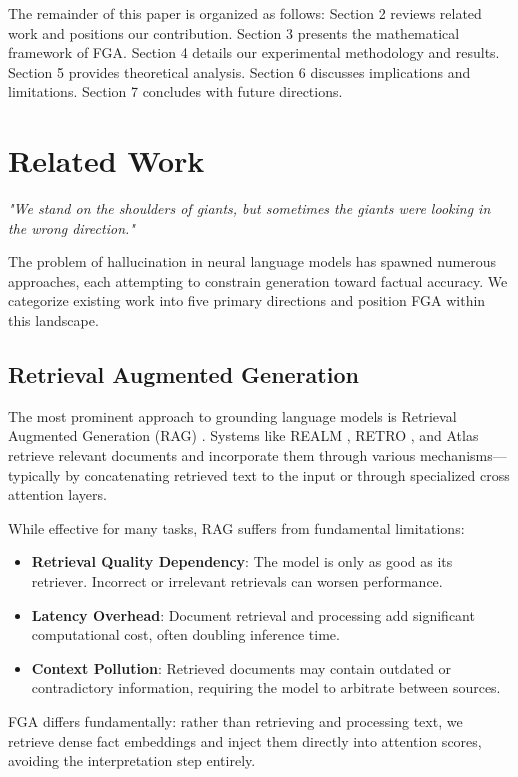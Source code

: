 \documentclass[11pt, a4paper]{article}
\theoremstyle{definition}
\begin{document}
The remainder of this paper is organized as follows: Section 2 reviews related work and positions our contribution. Section 3 presents the mathematical framework of FGA. Section 4 details our experimental methodology and results. Section 5 provides theoretical analysis. Section 6 discusses implications and limitations. Section 7 concludes with future directions.

\section{Related Work}

\textit{"We stand on the shoulders of giants, but sometimes the giants were looking in the wrong direction."}

The problem of hallucination in neural language models has spawned numerous approaches, each attempting to constrain generation toward factual accuracy. We categorize existing work into five primary directions and position FGA within this landscape.

\subsection{Retrieval Augmented Generation}

The most prominent approach to grounding language models is Retrieval Augmented Generation (RAG) \cite{lewis2020retrieval}. Systems like REALM \cite{guu2020retrieval}, RETRO \cite{borgeaud2022improving}, and Atlas \cite{izacard2022atlas} retrieve relevant documents and incorporate them through various mechanisms—typically by concatenating retrieved text to the input or through specialized cross attention layers.

While effective for many tasks, RAG suffers from fundamental limitations:
\begin{itemize}
    \item \textbf{Retrieval Quality Dependency}: The model is only as good as its retriever. Incorrect or irrelevant retrievals can worsen performance.
    \item \textbf{Latency Overhead}: Document retrieval and processing add significant computational cost, often doubling inference time.
    \item \textbf{Context Pollution}: Retrieved documents may contain outdated or contradictory information, requiring the model to arbitrate between sources.
\end{itemize}

FGA differs fundamentally: rather than retrieving and processing text, we retrieve dense fact embeddings and inject them directly into attention scores, avoiding the interpretation step entirely.
\end{document}

